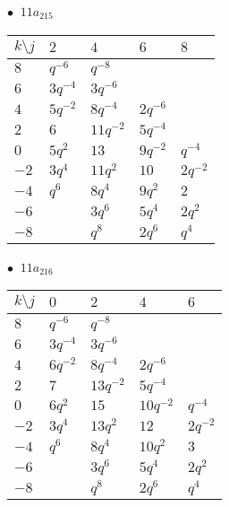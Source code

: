 \begin{minipage}{\linewidth}
$\bullet\ $ $11a_{215}$ \vspace{0.5em} \\
\begin{tabular}{l|llll}
$k \setminus j$ & $2$ & $4$ & $6$ & $8$ \\
\hline
$8$ & $q^{-6}$ & $q^{-8}$ &  &  \\
$6$ & $3q^{-4}$ & $3q^{-6}$ &  &  \\
$4$ & $5q^{-2}$ & $8q^{-4}$ & $2q^{-6}$ &  \\
$2$ & $6$ & $11q^{-2}$ & $5q^{-4}$ &  \\
$0$ & $5q^{2}$ & $13$ & $9q^{-2}$ & $q^{-4}$ \\
$-2$ & $3q^{4}$ & $11q^{2}$ & $10$ & $2q^{-2}$ \\
$-4$ & $q^{6}$ & $8q^{4}$ & $9q^{2}$ & $2$ \\
$-6$ &  & $3q^{6}$ & $5q^{4}$ & $2q^{2}$ \\
$-8$ &  & $q^{8}$ & $2q^{6}$ & $q^{4}$ \\
\end{tabular}
\vspace{2em}
\end{minipage}
%
\begin{minipage}{\linewidth}
$\bullet\ $ $11a_{216}$ \vspace{0.5em} \\
\begin{tabular}{l|llll}
$k \setminus j$ & $0$ & $2$ & $4$ & $6$ \\
\hline
$8$ & $q^{-6}$ & $q^{-8}$ &  &  \\
$6$ & $3q^{-4}$ & $3q^{-6}$ &  &  \\
$4$ & $6q^{-2}$ & $8q^{-4}$ & $2q^{-6}$ &  \\
$2$ & $7$ & $13q^{-2}$ & $5q^{-4}$ &  \\
$0$ & $6q^{2}$ & $15$ & $10q^{-2}$ & $q^{-4}$ \\
$-2$ & $3q^{4}$ & $13q^{2}$ & $12$ & $2q^{-2}$ \\
$-4$ & $q^{6}$ & $8q^{4}$ & $10q^{2}$ & $3$ \\
$-6$ &  & $3q^{6}$ & $5q^{4}$ & $2q^{2}$ \\
$-8$ &  & $q^{8}$ & $2q^{6}$ & $q^{4}$ \\
\end{tabular}
\vspace{2em}
\end{minipage}
%
